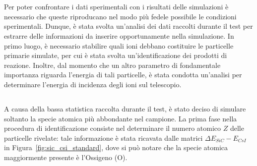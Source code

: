 \section{}

Per poter confrontare i dati sperimentali con i risultati delle simulazioni è necessario che queste riproducano nel modo più fedele possibile le condizioni sperimentali.
Dunque, è stata svolta un'analisi dei dati raccolti durante il test per estrarre delle informazioni da inserire opportunamente nella simulazione.
In primo luogo, è necessario stabilire quali ioni debbano costituire le particelle primarie simulate, per cui è stata svolta un'identificazione dei prodotti di reazione.
Inoltre, dal momento che un altro parametro di fondamentale importanza riguarda l'energia di tali particelle, è stata condotta un'analisi per determinare l'energia di incidenza degli ioni sul telescopio.



\subsection{}

A causa della bassa statistica raccolta durante il test, è stato deciso di simulare soltanto la specie atomica più abbondante nel campione.
La prima fase nella procedura di identificazione consiste nel determinare il numero atomico $Z$ delle particelle rivelate: tale informazione è stata ricavata dalle matrici $\Delta E_{SiC} - E_{CsI}$ in Figura~\ref{fig:sic_csi_standard}, dove si può notare che la specie atomica maggiormente presente è l'Ossigeno (O). 

